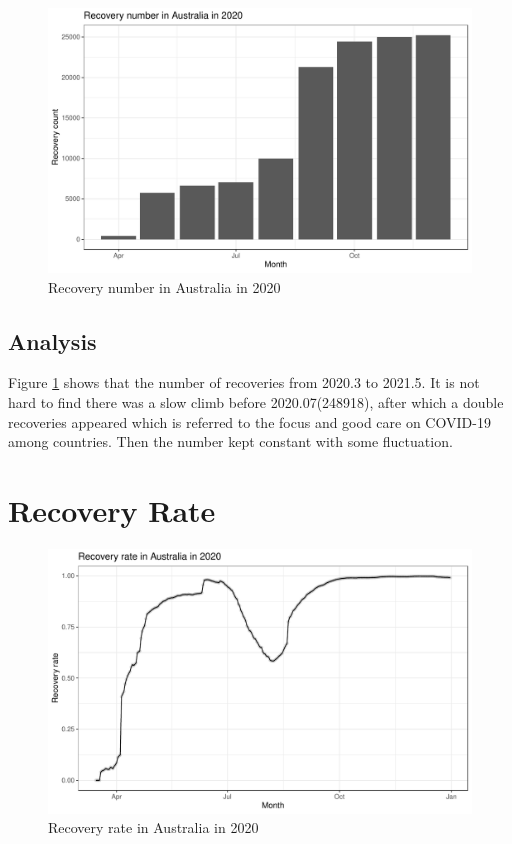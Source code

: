 \documentclass[11pt,a4paper,]{article}
\begin{document}
\begin{figure}
\centering
\includegraphics{report_files/figure-latex/figrec1-1.pdf}
\caption{\label{fig:figrec1}Recovery number in Australia in 2020}
\end{figure}

\hypertarget{analysis-3}{%
\subsection{Analysis}\label{analysis-3}}

Figure \ref{fig:figrec1} shows that the number of recoveries from 2020.3 to 2021.5. It is not hard to find there was a slow climb before 2020.07(248918), after which a double recoveries appeared which is referred to the focus and good care on COVID-19 among countries. Then the number kept constant with some fluctuation.

\hypertarget{recovery-rate}{%
\section{Recovery Rate}\label{recovery-rate}}

\begin{figure}
\centering
\includegraphics{report_files/figure-latex/figrec2-1.pdf}
\caption{\label{fig:figrec2}Recovery rate in Australia in 2020}
\end{figure}
\end{document}
